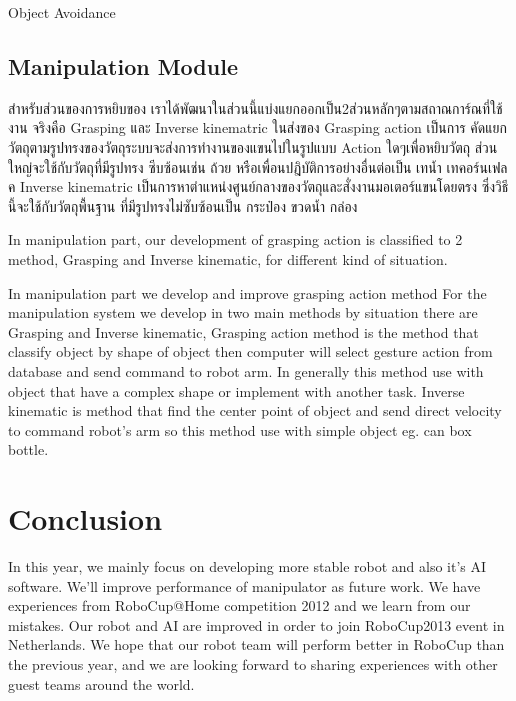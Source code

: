 \documentclass{llncs}
\begin{document}
Object Avoidance

\subsection{Manipulation Module}
 สำหรับส่วนของการหยิบของ เราได้พัฒนาในส่วนนี้แบ่งแยกออกเป็น2ส่วนหลักๆตามสถาณการ์ณที่ใช้งาน จริงคือ Grasping และ Inverse kinematric ในส่งของ Grasping action เป็นการ คัดแยกวัตถุตามรูปทรงของวัตถุระบบจะส่งการทำงานของแขนไปในรูปแบบ Action ใดๆเพื่อหยิบวัตถุ ส่วนใหญ่จะใช้กับวัตถุที่มีรูปทรง ซีบซ้อนเช่น ถ้วย หรือเพื่อนปฎิบัติการอย่างอื่นต่อเป็น เทน้ำ เทคอร์นเฟลค Inverse kinematric เป็นการหาตำแหน่งศูนย์กลางของวัตถุและสั่งงานมอเตอร์แขนโดยตรง ซึ่งวิธีนี้จะใช้กับวัตถุพื้นฐาน ที่มีรูปทรงไม่ซับซ้อนเป็น กระป๋อง ขวดน้ำ กล่อง

In manipulation part, our development of grasping action is classified to 2 method, Grasping and Inverse kinematic, for different kind of situation. 


In manipulation part we develop and improve grasping action method For the manipulation system we develop in two main methods by situation there are Grasping and Inverse kinematic, Grasping action method is the method that classify object by shape of object then computer will select gesture action from database and send command to robot arm. In generally this method use with object that have a complex shape or implement with another task. Inverse kinematic is method that find the center point of object and send direct velocity to command robot's arm so this method use with simple object eg. can box bottle.

\section{Conclusion}

In this year, we mainly focus on developing more stable robot and also it's AI software. We'll improve performance of manipulator as future work. We have experiences from RoboCup@Home competition 2012 and we learn from our mistakes. Our robot and AI are improved in order to join RoboCup2013 event in Netherlands. We hope that our robot team will perform better in RoboCup than the previous year, and we are looking forward to sharing experiences with other guest teams around the world.
\end{document}
